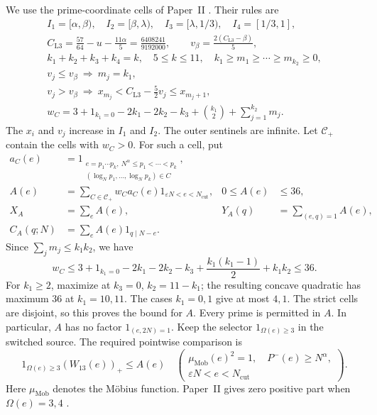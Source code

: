 We use the prime-coordinate cells of Paper~II
\cite[(5.29a)--(5.31)]{PaperII}.
Their rules are
\begin{equation}\label{eq:l3-descriptors}
\begin{gathered}
 I_1=[\alpha,\beta),\quad I_2=[\beta,\lambda),\quad
 I_3=[\lambda,1/3),\quad I_4=[1/3,1],\\
 C_{\mathrm{L3}}=\frac{57}{64}-u-\frac{11\alpha}{5}
       =\frac{6408241}{9192000},\qquad
 v_\beta=\frac{2(C_{\mathrm{L3}}-\beta)}5,\\
 k_1+k_2+k_3+k_4=k,\quad 5\le k\le11,\quad
 k_1\ge m_1\ge\cdots\ge m_{k_2}\ge0,\\
 v_j\le v_\beta\ \Longrightarrow\ m_j=k_1,\\
 v_j>v_\beta\ \Longrightarrow\
 x_{m_j}<C_{\mathrm{L3}}-\frac52v_j\le x_{m_j+1},\\
 w_C=3+1_{k_1=0}-2k_1-2k_2-k_3+
            \binom{k_1}{2}+\sum_{j=1}^{k_2}m_j.
\end{gathered}
\end{equation}
The $x_i$ and $v_j$ increase in $I_1$ and $I_2$.
The outer sentinels are infinite.
Let $\mathcal C_+$ contain the cells with $w_C>0$.
For such a cell, put
\begin{equation}\label{eq:l3-source}
\begin{aligned}
 a_C(e)&=1_{\substack{e=p_1\cdots p_k,\ N^\alpha\le p_1<\cdots<p_k\\
             (\log_Np_1,\ldots,\log_Np_k)\in C}},\\
 A(e)&=\sum_{C\in\mathcal C_+}w_Ca_C(e)
                     1_{\varepsilon N<e<N_{\mathrm{cut}}},
                     &0\le A(e)&\le36,\\
 X_A&=\sum_eA(e),&Y_A(q)&=\sum_{(e,q)=1}A(e),\\
 C_A(q;N)&=\sum_eA(e)1_{q\mid N-e}.&&
\end{aligned}
\end{equation}
Since $\sum_jm_j\le k_1k_2$, we have
\[
 w_C\le3+1_{k_1=0}-2k_1-2k_2-k_3
             +\frac{k_1(k_1-1)}2+k_1k_2\le36.
\]
For $k_1\ge2$, maximize at $k_3=0$, $k_2=11-k_1$;
the resulting concave quadratic has maximum $36$ at $k_1=10,11$.
The cases $k_1=0,1$ give at most $4,1$.
The strict cells are disjoint, so this proves the bound for $A$.
Every prime is permitted in $A$.
In particular, $A$ has no factor $1_{(e,2N)=1}$.
Keep the selector $1_{\Omega(e)\ge3}$ in the switched source.
The required pointwise comparison is
\begin{equation}\label{eq:l3-domination}
 1_{\Omega(e)\ge3}(W_{13}(e))_+\le A(e)
 \quad\left(\begin{gathered}
 \mu_{\mathrm{Mob}}(e)^2=1,\quad P^-(e)\ge N^\alpha,\\
 \varepsilon N<e<N_{\mathrm{cut}}
 \end{gathered}\right).
\end{equation}
Here $\mu_{\mathrm{Mob}}$ denotes the M\"obius function.
Paper~II gives zero positive part when $\Omega(e)=3,4$
\cite[(1.7), (4.9), (5.29a)--(5.31)]{PaperII}.
